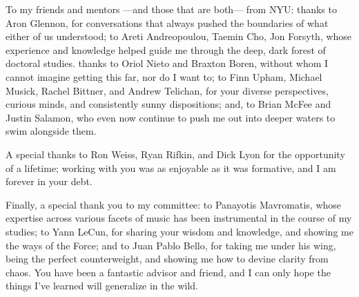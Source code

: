 To my friends and mentors ---and those that are both--- from NYU:
thanks to Aron Glennon, for conversations that always pushed the boundaries of what either of us understood;
to Areti Andreopoulou, Taemin Cho, Jon Forsyth, whose experience and knowledge helped guide me through the deep, dark forest of doctoral studies.
thanks to Oriol Nieto and Braxton Boren, without whom I cannot imagine getting this far, nor do I want to;
to Finn Upham, Michael Musick, Rachel Bittner, and Andrew Telichan, for your diverse perspectives, curious minds, and consistently sunny dispositions;
and, to Brian McFee and Justin Salamon, who even now continue to push me out into deeper waters to swim alongside them.

A special thanks to Ron Weiss, Ryan Rifkin, and Dick Lyon for the opportunity of a lifetime;
working with you was as enjoyable as it was formative, and I am forever in your debt.

Finally, a special thank you to my committee:
to Panayotis Mavromatis, whose expertise across various facets of music has been instrumental in the course of my studies;
to Yann LeCun, for sharing your wisdom and knowledge, and showing me the ways of the Force;
and to Juan Pablo Bello, for taking me under his wing, being the perfect counterweight, and showing me how to devine clarity from chaos.
You have been a fantastic advisor and friend, and I can only hope the things I've learned will generalize in the wild.


